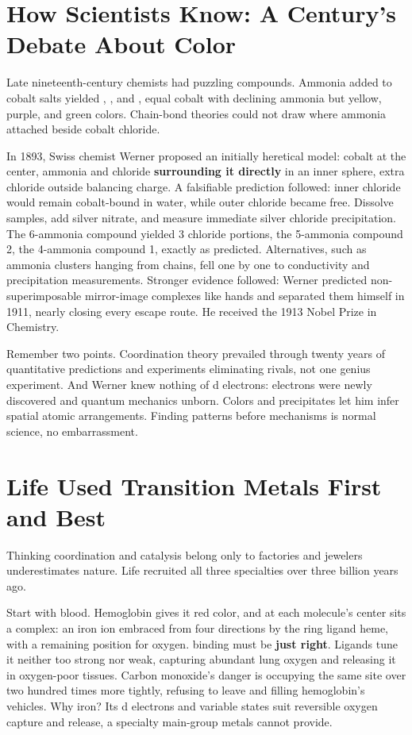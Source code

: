\section{How Scientists Know: A Century's Debate About Color}

\begin{zhengju}
Late nineteenth-century chemists had puzzling compounds. Ammonia added to cobalt salts yielded , , and , equal cobalt with declining ammonia but yellow, purple, and green colors. Chain-bond theories could not draw where ammonia attached beside cobalt chloride.

In 1893, Swiss chemist Werner proposed an initially heretical model: cobalt at the center, ammonia and chloride \textbf{surrounding it directly} in an inner sphere, extra chloride outside balancing charge. A falsifiable prediction followed: inner chloride would remain cobalt-bound in water, while outer chloride became free. Dissolve samples, add silver nitrate, and measure immediate silver chloride precipitation. The 6-ammonia compound yielded 3 chloride portions, the 5-ammonia compound 2, the 4-ammonia compound 1, exactly as predicted. Alternatives, such as ammonia clusters hanging from chains, fell one by one to conductivity and precipitation measurements. Stronger evidence followed: Werner predicted non-superimposable mirror-image complexes like hands and separated them himself in 1911, nearly closing every escape route. He received the 1913 Nobel Prize in Chemistry.

Remember two points. Coordination theory prevailed through twenty years of quantitative predictions and experiments eliminating rivals, not one genius experiment. And Werner knew nothing of d electrons: electrons were newly discovered and quantum mechanics unborn. Colors and precipitates let him infer spatial atomic arrangements. Finding patterns before mechanisms is normal science, no embarrassment.
\end{zhengju}

\section{Life Used Transition Metals First and Best}

Thinking coordination and catalysis belong only to factories and jewelers underestimates nature. Life recruited all three specialties over three billion years ago.

Start with blood. Hemoglobin gives it red color, and at each molecule's center sits a complex: an iron ion embraced from four directions by the ring ligand heme, with a remaining position for oxygen.  binding  must be \textbf{just right}. Ligands tune it neither too strong nor weak, capturing abundant lung oxygen and releasing it in oxygen-poor tissues. Carbon monoxide's danger is occupying the same site over two hundred times more tightly, refusing to leave and filling hemoglobin's vehicles. Why iron? Its d electrons and variable states suit reversible oxygen capture and release, a specialty main-group metals cannot provide.

